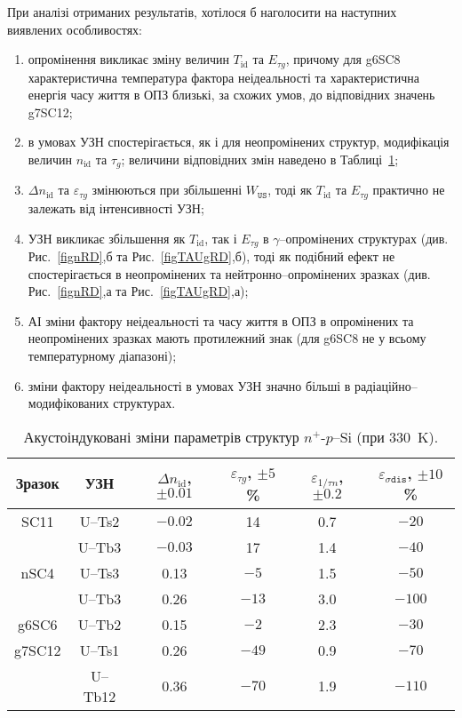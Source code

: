 При аналізі отриманих результатів, хотілося б наголосити на наступних виявлених особливостях:
\begin{enumerate}[label=\asbuk*),leftmargin=0em,itemindent=1.5em]
\item опромінення викликає зміну величин  $T_{\mathrm{id}}$ та $E_{\tau g}$, причому
 для  g6SC8 характеристична температура фактора неідеальності та характеристична енергія часу життя в ОПЗ
 близькі, за схожих умов, до відповідних значень  g7SC12;

\item в умовах УЗН спостерігається, як і для неопромінених структур, модифікація величин $n_{\mathrm{id}}$ та $\tau_g$;
  величини відповідних змін наведено в Таблиці~\ref{tabAIchangeRD};

\item $\Delta n_{\mathrm{id}}$ та $\varepsilon_{\tau g}$ змінюються при збільшенні $W_{\mathtt{US}}$,
 тоді як $T_{\mathrm{id}}$ та $E_{\tau g}$ практично не залежать від інтенсивності УЗН;

\item УЗН викликає збільшення як  $T_{\mathrm{id}}$, так і $E_{\tau g}$ в $\gamma$--опромінених структурах
(див. Рис.~\ref{fignRD},б та Рис.~\ref{figTAUgRD},б),
тоді як подібний ефект не спостерігається в неопромінених та нейтронно--опромінених зразках
(див. Рис.~\ref{fignRD},а та Рис.~\ref{figTAUgRD},а);

\item АІ зміни фактору неідеальності та часу життя в ОПЗ в опромінених та неопромінених зразках мають протилежний знак
 (для g6SC8 не у всьому температурному діапазоні);

\item зміни фактору неідеальності в умовах УЗН значно більші в радіаційно--модифікованих структурах.
\end{enumerate}


\begin{table}
\caption{\label{tabAIchangeRD}Акустоіндуковані зміни параметрів структур $n^+$-$p$--Si (при 330~K).
}
\center
\begin{tabular}{|c|c|c|c|c|c|} \hline
Зразок&УЗН&$\Delta n_{\mathrm{id}}$, $\pm0.01$&$\varepsilon_{\tau g}$, $\pm5$\%&$\varepsilon_{1/\tau n}$, $\pm0.2$&$\varepsilon_{\sigma\mathtt{dis}}$, $\pm10$\%\\
\hline
SC11&U--Ts2&$-0.02$&14&0.7&$-20$\\
&U--Tb3&$-0.03$&17&1.4&$-40$\\ \hline
nSC4&U--Ts3&0.13&$-5$&1.5&$-50$\\
&U--Tb3&0.26&$-13$&3.0&$-100$\\ \hline
g6SC6&U--Tb2&0.15&$-2$&2.3&$-30$\\ \hline
g7SC12&U--Ts1&0.26&$-49$&0.9&$-70$\\
&U--Tb12&0.36&$-70$&1.9&$-110$\\ \hline
\end{tabular}
\end{table}

